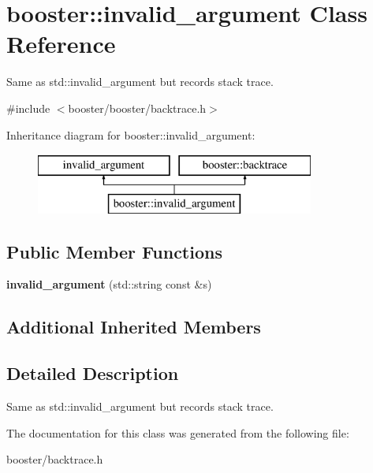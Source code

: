 \section{booster\+:\+:invalid\+\_\+argument Class Reference}
\label{classbooster_1_1invalid__argument}


Same as std\+::invalid\+\_\+argument but records stack trace.  




{\ttfamily \#include $<$booster/booster/backtrace.\+h$>$}

Inheritance diagram for booster\+:\+:invalid\+\_\+argument\+:\begin{figure}[H]
\begin{center}
\leavevmode
\includegraphics[height=2.000000cm]{classbooster_1_1invalid__argument}
\end{center}
\end{figure}
\subsection*{Public Member Functions}
\begin{DoxyCompactItemize}
\item 
{\bfseries invalid\+\_\+argument} (std\+::string const \&s)\label{classbooster_1_1invalid__argument_a51dd0443006b5636515ff1e38dccc6a6}

\end{DoxyCompactItemize}
\subsection*{Additional Inherited Members}


\subsection{Detailed Description}
Same as std\+::invalid\+\_\+argument but records stack trace. 

The documentation for this class was generated from the following file\+:\begin{DoxyCompactItemize}
\item 
booster/backtrace.\+h\end{DoxyCompactItemize}
